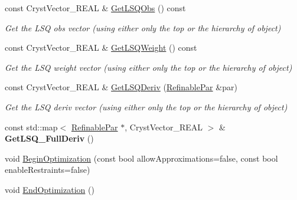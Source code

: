 \begin{DoxyCompactItemize}
const Cryst\+Vector\+\_\+\+R\+E\+AL \& \mbox{\hyperlink{class_obj_cryst_1_1_l_s_q_num_obj_aa31843004c510a2d98063c54d410521d}{Get\+L\+S\+Q\+Obs}} () const
\begin{DoxyCompactList}\small\item\em Get the L\+SQ obs vector (using either only the top or the hierarchy of object) \end{DoxyCompactList}\item 
\mbox{\label{class_obj_cryst_1_1_l_s_q_num_obj_a9d52c7a1eef7a810189c0ca96ade3ecf}} 
const Cryst\+Vector\+\_\+\+R\+E\+AL \& \mbox{\hyperlink{class_obj_cryst_1_1_l_s_q_num_obj_a9d52c7a1eef7a810189c0ca96ade3ecf}{Get\+L\+S\+Q\+Weight}} () const
\begin{DoxyCompactList}\small\item\em Get the L\+SQ weight vector (using either only the top or the hierarchy of object) \end{DoxyCompactList}\item 
\mbox{\label{class_obj_cryst_1_1_l_s_q_num_obj_ad0510e8765e20c74f72d0c36daf94f86}} 
const Cryst\+Vector\+\_\+\+R\+E\+AL \& \mbox{\hyperlink{class_obj_cryst_1_1_l_s_q_num_obj_ad0510e8765e20c74f72d0c36daf94f86}{Get\+L\+S\+Q\+Deriv}} (\mbox{\hyperlink{class_obj_cryst_1_1_refinable_par}{Refinable\+Par}} \&par)
\begin{DoxyCompactList}\small\item\em Get the L\+SQ deriv vector (using either only the top or the hierarchy of object) \end{DoxyCompactList}\item 
\mbox{\label{class_obj_cryst_1_1_l_s_q_num_obj_a0ec930c38802fb8db5babbdecebc510b}} 
const std\+::map$<$ \mbox{\hyperlink{class_obj_cryst_1_1_refinable_par}{Refinable\+Par}} $\ast$, Cryst\+Vector\+\_\+\+R\+E\+AL $>$ \& {\bfseries Get\+L\+S\+Q\+\_\+\+Full\+Deriv} ()
\item 
void \mbox{\hyperlink{class_obj_cryst_1_1_l_s_q_num_obj_a6230c952ec8fc2c0ed63ac1b4de232a5}{Begin\+Optimization}} (const bool allow\+Approximations=false, const bool enable\+Restraints=false)
\item 
void \mbox{\hyperlink{class_obj_cryst_1_1_l_s_q_num_obj_a4c6168e319fd4a8f949997d1b54012ba}{End\+Optimization}} ()
\end{DoxyCompactItemize}


